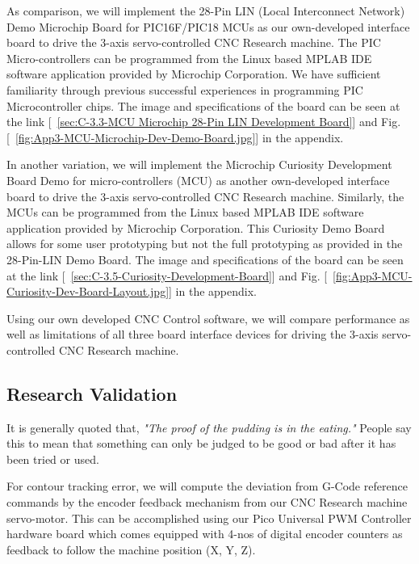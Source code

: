 As comparison, we will implement the 28-Pin LIN (Local Interconnect Network) Demo Microchip Board for PIC16F/PIC18 MCUs as our own-developed interface board to drive the 3-axis servo-controlled CNC Research machine. The PIC Micro-controllers can be programmed from the Linux based MPLAB IDE software application provided by Microchip Corporation. We have sufficient familiarity through previous successful experiences in programming PIC Microcontroller chips. The image and specifications of the board can be seen at the link [~\ref{sec:C-3.3-MCU Microchip 28-Pin LIN Development Board}] and Fig. [~\ref{fig:App3-MCU-Microchip-Dev-Demo-Board.jpg}] in the appendix.
\vspace{0.5cm}

In another variation, we will implement the Microchip Curiosity Development Board Demo for micro-controllers (MCU) as another own-developed interface board to drive the 3-axis servo-controlled CNC Research machine. Similarly, the MCUs can be programmed from the Linux based MPLAB IDE software application provided by Microchip Corporation. This Curiosity Demo Board allows for some user prototyping but not the full prototyping as provided in the 28-Pin-LIN Demo Board. The image and specifications of the board can be seen at the link [~\ref{sec:C-3.5-Curiosity-Development-Board}] and  Fig. [~\ref{fig:App3-MCU-Curiosity-Dev-Board-Layout.jpg}] in the appendix.
\vspace{0.5cm}

Using our own developed CNC Control software, we will compare performance as well as limitations of all three board interface devices for driving the 3-axis servo-controlled CNC Research machine. 
  
\subsection{Research Validation}

It is generally quoted that, \textit{"The proof of the pudding is in the eating."} People say this to mean that something can only be judged to be good or bad after it has been tried or used. 
\vspace{0.5cm}

For contour tracking error, we will compute the deviation from G-Code reference commands by the encoder feedback mechanism from our CNC Research machine servo-motor. This can be accomplished using our Pico Universal PWM Controller hardware board which comes equipped with 4-nos of digital encoder counters as feedback to follow the machine position (X, Y, Z).
\vspace{0.5cm}

